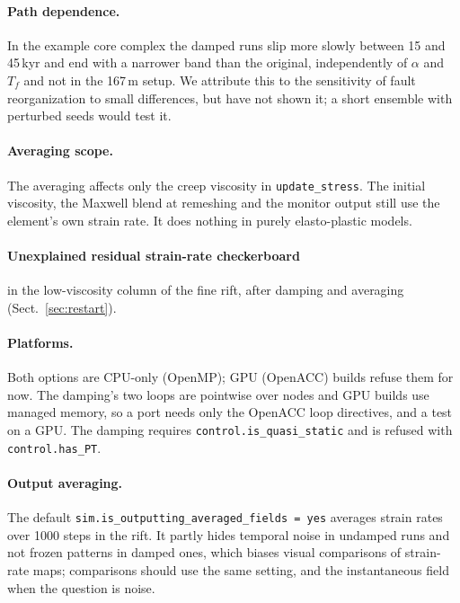 \documentclass[11pt]{article}
\newcommand{\code}[1]{\texttt{#1}}
\begin{document}
\paragraph{Path dependence.} In the example core complex the damped runs slip more slowly between
15 and 45\,kyr and end with a narrower band than the original, independently of $\alpha$ and $T_f$
and not in the 167\,m setup. We attribute this to the sensitivity of fault reorganization to small
differences, but have not shown it; a short ensemble with perturbed seeds would test it.

\paragraph{Averaging scope.} The averaging affects only the creep viscosity in
\code{update\_stress}. The initial viscosity, the Maxwell blend at remeshing and the monitor output
still use the element's own strain rate. It does nothing in purely elasto-plastic models.

\paragraph{Unexplained residual strain-rate checkerboard} in the low-viscosity column of the fine
rift, after damping and averaging (Sect.~\ref{sec:restart}).

\paragraph{Platforms.} Both options are CPU-only (OpenMP); GPU (OpenACC) builds refuse them for
now. The damping's two loops are pointwise over nodes and GPU builds use managed memory, so a port
needs only the OpenACC loop directives, and a test on a GPU. The
damping requires \code{control.is\_quasi\_static} and is refused with \code{control.has\_PT}.

\paragraph{Output averaging.} The default \code{sim.is\_outputting\_averaged\_fields = yes}
averages strain rates over 1000 steps in the rift. It partly hides temporal noise in undamped runs
and not frozen patterns in damped ones, which biases visual comparisons of strain-rate maps;
comparisons should use the same setting, and the instantaneous field when the question is noise.

\end{document}
